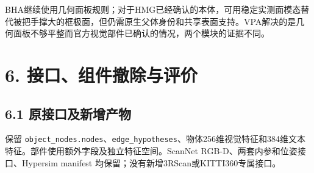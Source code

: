 \documentclass[UTF8,fontset=fandol]{ctexart}
\begin{document}
BHA继续使用几何面板规则；对于HMG已经确认的本体，可用稳定实测面模态替代被把手撑大的框极面，但仍需原生父体身份和共享表面支持。VPA解决的是几何面板不够平整而官方视觉部件已确认的情况，两个模块的证据不同。



\section*{6. 接口、组件撤除与评价}

\subsection*{6.1 原接口及新增产物}

保留 \texttt{object\_\allowbreak{}nodes.\allowbreak{}nodes}、\texttt{edge\_\allowbreak{}hypotheses}、物体256维视觉特征和384维文本特征。部件使用额外字段及独立特征空间。ScanNet RGB-D、两套内参和位姿接口、Hypersim manifest 均保留；没有新增3RScan或KITTI360专属接口。
\end{document}
